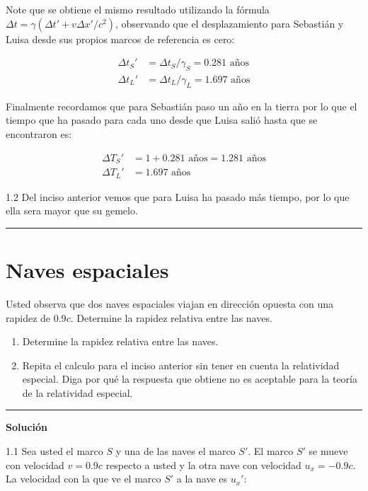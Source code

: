 \documentclass[12pt]{article}
\begin{document}
Note que se obtiene el mismo resultado utilizando la fórmula $\Delta t = \gamma(\Delta t'+v\Delta x'/c^2)$, observando que el desplazamiento para Sebastián y Luisa desde sus propios marcos de referencia es cero:

\begin{align*}
\Delta t_S'&=\Delta  t_S/\gamma_S =  0.281 \text{ años}\\
\Delta t_L'&= \Delta t_L/\gamma_L = 1.697  \text{ años} 
\end{align*}
 

Finalmente recordamos que para Sebastián paso un año en la tierra por lo que el tiempo que ha pasado para cada uno desde que Luisa salió hasta que se encontraron es:

\begin{align}
\Delta T_S'&= 1+0.281  \text{ años} =1.281  \text{ años}\\
\Delta T_L'&= 1.697  \text{ años} 
\end{align}


1.2 Del inciso anterior vemos que para Luisa ha pasado más tiempo, por lo que ella sera mayor que su gemelo.

\noindent\rule{16.5cm}{0.4pt}


\section{Naves espaciales}

Usted observa que dos naves espaciales viajan en dirección opuesta con una rapidez de $0.9 c$. Determine la rapidez relativa entre las naves.\\

\begin{enumerate}
	\item Determine la rapidez relativa entre las naves.
	\item Repita el calculo para el inciso anterior sin tener en cuenta la relatividad especial. Diga por qué la respuesta que obtiene no es aceptable para la teoría de la relatividad especial. 
\end{enumerate}
\noindent\rule{16.5cm}{0.4pt}

\begin{center}
	\textbf{Solución}	
\end{center}

1.1 Sea usted el marco $S$ y una de las naves el marco $S'$. El marco $S'$ se mueve con velocidad $v = 0.9c$ respecto a usted y la otra nave con velocidad $u_x = -0.9c$. La velocidad con la que ve el marco $S'$ a la nave es $u_x'$:
\end{document}
